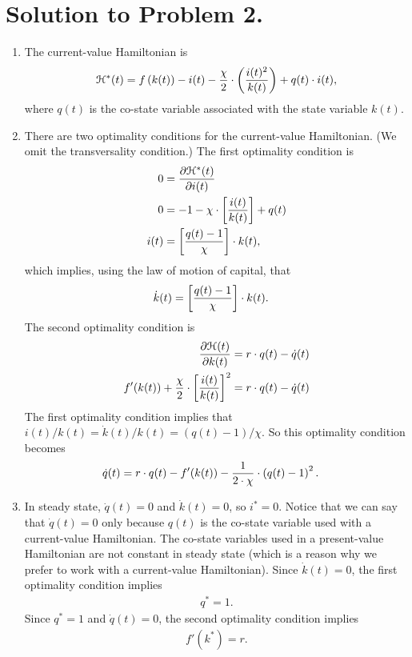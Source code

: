 \documentclass[letterpaper,12pt,leqno]{article}
\begin{document}
\section*{Solution to Problem 2.}
\begin{enumerate}
\item The current-value Hamiltonian is
\begin{align*}
\mathcal{H}^{*}(t)=f\left( k(t) \right) -i(t)-\frac{\chi}{2}\cdot \left( \frac{i(t)^{2}}{k(t)} \right)+q(t)\cdot i(t), 
\end{align*}
where $q(t)$ is the co-state variable associated with the state variable $k(t)$.
\item There are two optimality conditions for the current-value Hamiltonian. (We omit the transversality condition.) The first optimality condition is
\begin{align*}
0&=\frac{\partial \mathcal{H}^{*}(t)}{\partial i(t)} \\
0&=-1-\chi \cdot \left[ \frac{i(t)}{k(t)} \right]+q(t) \\
i(t)&=\left[ \frac{q(t)-1}{\chi} \right]\cdot k(t),
\end{align*}
which implies, using the law of motion of capital, that
\begin{align*}
\dot{k}(t)&=\left[ \frac{q(t)-1}{\chi} \right]\cdot k(t).
\end{align*}
The second optimality condition is
\begin{align*}
\frac{\partial \mathcal{H}(t)}{\partial k(t)} &=r\cdot q(t)-\dot{q}(t)\\
f'(k(t)) +\frac{\chi}{2}\cdot \left[ \frac{i(t)}{k(t)} \right]^{2}&=r\cdot q(t)-\dot{q}(t)
\end{align*}
The first optimality condition implies that $i(t)/k(t)=\dot{k}(t)/k(t)=(q(t)-1)/\chi$. So this optimality condition becomes
\begin{align*}
\dot{q}(t)&=r\cdot q(t)-f'(k(t))-\frac{1}{2\cdot \chi}\cdot \left( q(t)-1 \right)^{2}.
\end{align*}
\item In steady state, $\dot{q}(t)=0$ and $\dot{k}(t)=0$, so $i^{*}=0$. Notice that we can say that $\dot{q}(t)=0$ only because $q(t)$ is the co-state variable used with a current-value Hamiltonian. The co-state variables used in a present-value Hamiltonian are not constant in steady state (which is a reason why we prefer to work with a current-value Hamiltonian). Since $\dot{k}(t)=0$, the first optimality condition implies
\begin{align*}
q^{*}=1.
\end{align*}
Since $q^{*}=1$ and $\dot{q}(t)=0$, the second optimality condition implies
\begin{align*} 
f'(k^{*})=r.
\end{align*}
\end{enumerate}
\end{document}
